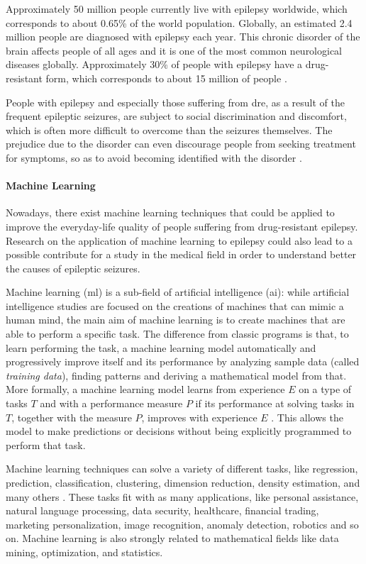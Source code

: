 Approximately 50 million people currently live with epilepsy worldwide, which corresponds to about 0.65\% of the world population. Globally, an estimated 2.4 million people are diagnosed with epilepsy each year. This chronic disorder of the brain affects people of all ages and it is one of the most common neurological diseases globally. Approximately 30\% of people with epilepsy have a drug-resistant form, which corresponds to about 15 million of people \cite{WHO:epilepsy}.

People with epilepsy and especially those suffering from \acs{dre}, as a result of the frequent epileptic seizures, are subject to social discrimination and discomfort, which is often more difficult to overcome than the seizures themselves. The prejudice due to the disorder can even discourage people from seeking treatment for symptoms, so as to avoid becoming identified with the disorder \cite{WHO:epilepsy}.

\paragraph{Machine Learning} Nowadays, there exist machine learning techniques that could be applied to improve the everyday-life quality of people suffering from drug-resistant epilepsy. Research on the application of machine learning to epilepsy could also lead to a possible contribute for a study in the medical field in order to understand better the causes of epileptic seizures.

Machine learning (\acs{ml}) is a sub-field of artificial intelligence (\acs{ai}): while artificial intelligence studies are focused on the creations of machines that can mimic a human mind, the main aim of machine learning is to create machines that are able to perform a specific task. The difference from classic programs is that, to learn performing the task, a machine learning model automatically and progressively improve itself and its performance by analyzing sample data (called \textit{training data}), finding patterns and deriving a mathematical model from that. More formally, a machine learning model learns from experience $E$ on a type of tasks $T$ and with a performance measure $P$ if its performance at solving tasks in $T$, together with the measure $P$, improves with experience $E$ \cite{McGraw:ml}. This allows the model to make predictions or decisions without being explicitly programmed to perform that task.

Machine learning techniques can solve a variety of different tasks, like regression, prediction, classification, clustering, dimension reduction, density estimation, and many others \cite{Springer:patternrecognitionandml}. These tasks fit with as many applications, like personal assistance, natural language processing, data security, healthcare, financial trading, marketing personalization, image recognition, anomaly detection, robotics and so on. Machine learning is also strongly related to mathematical fields like data mining, optimization, and statistics.

